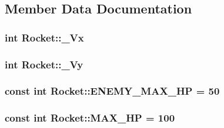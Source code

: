\subsection{Member Data Documentation}
\hypertarget{class_rocket_af29030dcde63c0c11f394855eabeb035}{
\subsubsection[{\-\_\-\-Vx}]{\setlength{\rightskip}{0pt plus 5cm}int Rocket\-::\-\_\-\-Vx\hspace{0.3cm}{\ttfamily [protected]}}}\label{class_rocket_af29030dcde63c0c11f394855eabeb035}
\hypertarget{class_rocket_a8755419e9cbd841f0ca08e9203d5d51b}{
\subsubsection[{\-\_\-\-Vy}]{\setlength{\rightskip}{0pt plus 5cm}int Rocket\-::\-\_\-\-Vy\hspace{0.3cm}{\ttfamily [protected]}}}\label{class_rocket_a8755419e9cbd841f0ca08e9203d5d51b}
\hypertarget{class_rocket_adf93733f7bd7643acfb98d5e9feab7c5}{
\subsubsection[{E\-N\-E\-M\-Y\-\_\-\-M\-A\-X\-\_\-\-H\-P}]{\setlength{\rightskip}{0pt plus 5cm}const int Rocket\-::\-E\-N\-E\-M\-Y\-\_\-\-M\-A\-X\-\_\-\-H\-P = 50\hspace{0.3cm}{\ttfamily [static]}}}\label{class_rocket_adf93733f7bd7643acfb98d5e9feab7c5}
\hypertarget{class_rocket_ad631a51a51c3dcbb927604c6b498498d}{
\subsubsection[{M\-A\-X\-\_\-\-H\-P}]{\setlength{\rightskip}{0pt plus 5cm}const int Rocket\-::\-M\-A\-X\-\_\-\-H\-P = 100\hspace{0.3cm}{\ttfamily [static]}}}\label{class_rocket_ad631a51a51c3dcbb927604c6b498498d}
